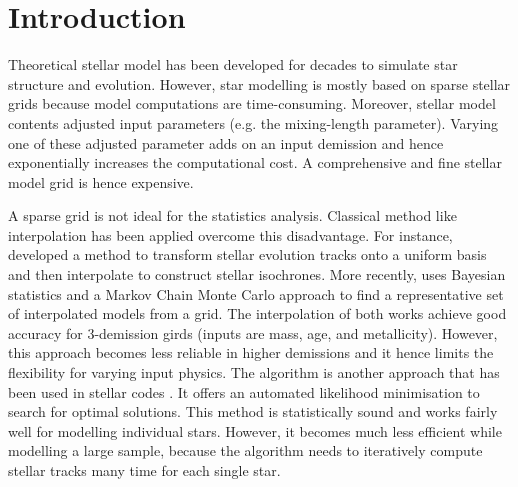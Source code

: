 \section{Introduction}

Theoretical stellar model has been developed for decades to simulate star structure and evolution. However, star modelling is mostly based on sparse stellar grids \citep[e.g.][]{2016ApJ...823..102C} because model computations are time-consuming. Moreover, stellar model contents adjusted input parameters (e.g. the mixing-length parameter). Varying one of these adjusted parameter adds on an input demission and hence exponentially increases the computational cost. A comprehensive and fine stellar model grid is hence expensive. 

A sparse grid is not ideal for the statistics analysis. Classical method like interpolation has been applied overcome this disadvantage. For instance, \citet{2016ApJS..222....8D} developed a method to transform stellar evolution tracks onto a uniform basis and then interpolate to construct stellar isochrones. More recently, \citet{2019MNRAS.484..771R} uses Bayesian statistics and a Markov Chain Monte Carlo approach to find a representative set of interpolated models from a grid. The interpolation of both works achieve good accuracy for 3-demission girds (inputs are mass, age, and metallicity). However, this approach becomes less reliable in higher demissions and it hence limits the flexibility for varying input physics. The algorithm is another approach that has been used in stellar codes \citep[e.g.][]{2013ApJS..208....4P}. It offers an automated likelihood minimisation to search for optimal solutions. This method is statistically sound and works fairly well for modelling individual stars. However, it becomes much less efficient while modelling a large sample, because the algorithm needs to iteratively compute stellar tracks many time for each single star.     


